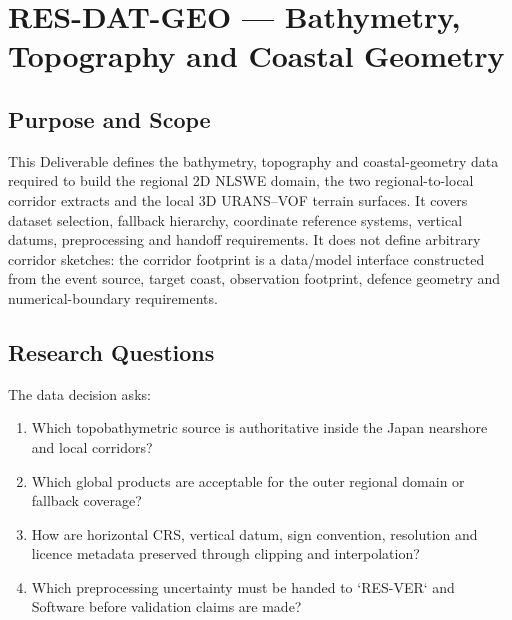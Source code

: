 
\section{RES-DAT-GEO --- Bathymetry, Topography and Coastal Geometry}
\label{sec:res-dat-geo}

\subsection{Purpose and Scope}
\label{sec:res-dat-geo-purpose}

This Deliverable defines the bathymetry, topography and coastal-geometry
data required to build the regional 2D NLSWE domain, the two
regional-to-local corridor extracts and the local 3D URANS--VOF
terrain surfaces. It covers dataset selection, fallback hierarchy,
coordinate reference systems, vertical datums, preprocessing and
handoff requirements. It does not define arbitrary corridor sketches:
the corridor footprint is a data/model interface constructed from the
event source, target coast, observation footprint, defence geometry and
numerical-boundary requirements.

\subsection{Research Questions}
\label{sec:res-dat-geo-research-questions}

The data decision asks:

\begin{enumerate}
  \item Which topobathymetric source is authoritative inside the Japan
    nearshore and local corridors?
  \item Which global products are acceptable for the outer regional
    domain or fallback coverage?
  \item How are horizontal CRS, vertical datum, sign convention,
    resolution and licence metadata preserved through clipping and
    interpolation?
  \item Which preprocessing uncertainty must be handed to `RES-VER`
    and Software before validation claims are made?
\end{enumerate}


